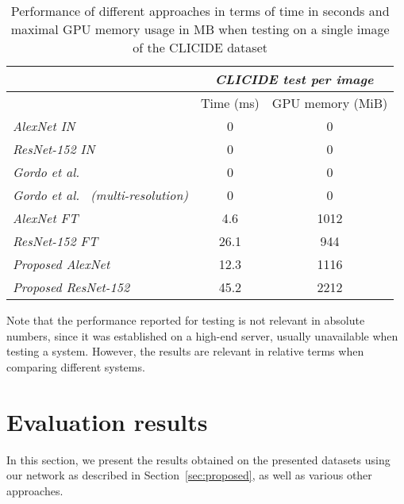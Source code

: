 \begin{table}
\begin{tabular}{|l|c|c|}
\hline & \multicolumn{2}{c|}{\emph{CLICIDE test per image}}\\
\hline & Time (ms) & GPU memory (MiB)\\
\hline \emph{AlexNet IN} & 0 & 0\\ %
\hline \emph{ResNet-152 IN} & 0 & 0\\
\hline \emph{Gordo et al.~\cite{gordo_deep_2016}} & 0 & 0\\
\hline \emph{Gordo et al.~\cite{gordo_deep_2016} (multi-resolution)}
& 0 & 0\\
\hline \emph{AlexNet FT} & 4.6 & 1012\\
\hline \emph{ResNet-152 FT} & 26.1 & 944\\
\hline \emph{Proposed AlexNet} & 12.3 & 1116\\
\hline \emph{Proposed ResNet-152} & 45.2 & 2212\\
\hline
\end{tabular}
\caption{Performance of different approaches in terms of time in seconds and
maximal GPU memory usage in MB when testing on a single image
of the CLICIDE dataset\label{tab:perftest}}
\end{table}

Note that the performance reported for testing is not relevant in absolute numbers,
since it was established on a high-end server, usually unavailable when testing
a system. However, the results are relevant in relative terms when comparing
different systems.



\section{Evaluation results}\label{sec:evalresults}
In this section, we present the results obtained on the presented datasets
using our network as described in Section~\ref{sec:proposed}, as well
as various other approaches.

